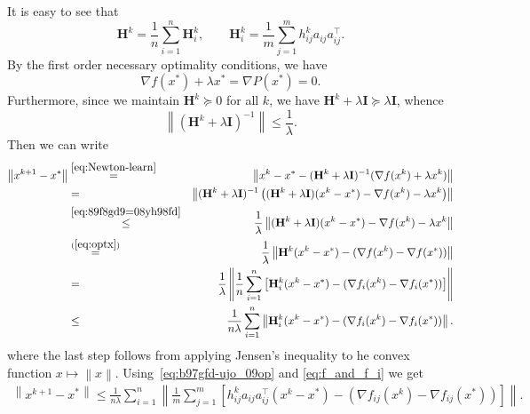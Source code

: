 \documentclass[12pt]{article}
\newcommand{\norm}[1]{\left\|#1\right\|}
\newcommand{\mH}{\mathbf{H}}
\newcommand{\mI}{\mathbf{I}}
\begin{document}
It is easy to see that \begin{equation}\label{eq:b97gfd-ujo_09op}\mH^k = \frac{1}{n} \sum_{i=1}^n \mH^k_i, \qquad \mH^k_i = \frac{1}{m} \sum_{j=1}^{m} h^k_{ij} a_{ij}a_{ij}^\top .\end{equation}
By the first order necessary optimality conditions, we have
\begin{equation}\label{eq:optx}
\nabla f(x^*) + \lambda x^*  = \nabla P(x^*)= 0. 
\end{equation}
Furthermore, since we maintain $\mH^k \succeq 0$ for all $k$, we have $\mH^k + \lambda \mI \succeq \lambda \mI$, whence  \begin{equation}\label{eq:89f8gd9=08yh98fd}\norm{\left(\mH^k + \lambda \mI \right)^{-1}} \leq \frac{1}{\lambda}.\end{equation}
Then we can write
\begin{eqnarray}
	\norm{ x^{k+1} - x^* } &\overset{\eqref{eq:Newton-learn}}{=}& \norm{ x^k - x^* - (\mH^k + \lambda \mI)^{-1} (\nabla f(x^k) + \lambda x^k) }\notag  \\
	&=& \norm{ (\mH^k + \lambda \mI)^{-1} \left(  (\mH^k + \lambda \mI)(x^k - x^*) - \nabla f(x^k) - \lambda x^k  \right) } \notag \\ 
	&\overset{\eqref{eq:89f8gd9=08yh98fd}}{\leq}& \frac{1}{\lambda} \norm{  (\mH^k + \lambda \mI)(x^k - x^*) - \nabla f(x^k) - \lambda x^k  } \notag \\ 
	&\overset{(\ref{eq:optx})}{=}& \frac{1}{\lambda} \norm{ \mH^k (x^k - x^*) - (\nabla f(x^k) - \nabla f(x^*)) } \notag \\ 
	&=& \frac{1}{\lambda} \norm{ \frac{1}{n} \sum_{i=1}^n \left[\mH_i^k (x^k - x^*) - (\nabla f_i(x^k) - \nabla f_i(x^*)) \right]}\notag  \\ 
	&\leq& \frac{1}{n \lambda} \sum_{i=1}^n \norm{ \mH_i^k (x^k - x^*) - (\nabla f_i(x^k) - \nabla f_i(x^*)) }.\notag
	\end{eqnarray}
	where the last step follows from applying Jensen's inequality to he convex function $x\mapsto \norm{x}$. Using~\eqref{eq:b97gfd-ujo_09op} and \eqref{eq:f_and_f_i} we get
	\begin{eqnarray}
	\norm{x^{k+1}-x^*} \leq \frac{1}{n \lambda} \sum_{i=1}^n \norm{ \frac{1}{m} \sum_{j=1}^m  \left[ h_{ij}^k a_{ij} a_{ij}^\top (x^k - x^*) - (\nabla f_{ij}(x^k) - \nabla f_{ij}(x^*)) \right] }.\label{eq:pop_us_lop_989f}
	\end{eqnarray}
	
\end{document}
